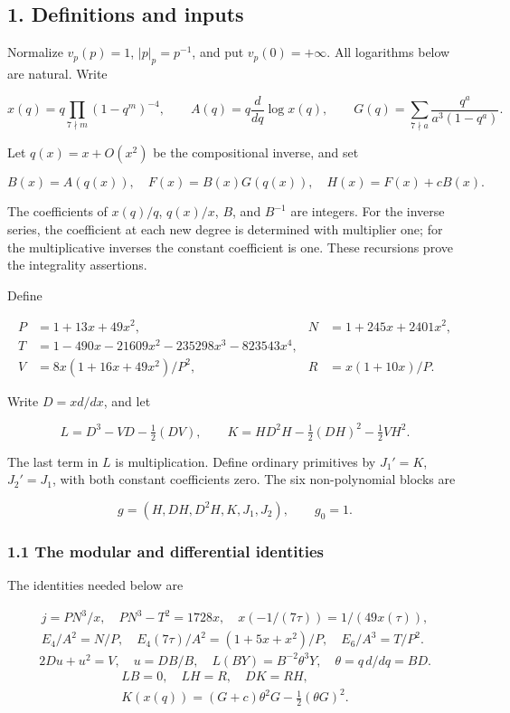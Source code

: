\documentclass[11pt,a4paper]{article}
\begin{document}
\hypertarget{definitions-and-inputs}{%
\subsection{1. Definitions and inputs}\label{definitions-and-inputs}}

Normalize \(v_p(p)=1\), \(|p|_p=p^{-1}\), and put \(v_p(0)=+∞\). All logarithms below are natural. Write

\[
x(q)=q\prod_{7\nmid m}(1-q^m)^{-4},\qquad
A(q)=q\frac{d}{dq}\log x(q),\qquad
G(q)=\sum_{7\nmid a}\frac{q^a}{a^3(1-q^a)}.
\]

Let \(q(x)=x+O(x^{2})\) be the compositional inverse, and set

\[
B(x)=A(q(x)),\quad F(x)=B(x)G(q(x)),\quad H(x)=F(x)+cB(x).
\]

The coefficients of \(x(q)/q\), \(q(x)/x\), \(B\), and \(B^{-1}\) are integers. For the inverse series, the coefficient at each new degree is determined with multiplier one; for the multiplicative inverses the constant coefficient is one. These recursions prove the integrality assertions.

Define

\[
\begin{aligned}
P&=1+13x+49x^2,&N&=1+245x+2401x^2,\\
T&=1-490x-21609x^2-235298x^3-823543x^4,\\
V&=8x(1+16x+49x^2)/P^2,&R&=x(1+10x)/P.
\end{aligned}
\]

Write \(D=x d/dx\), and let

\[
L=D^3-VD-\tfrac12(DV),\qquad
K=HD^2H-\tfrac12(DH)^2-\tfrac12VH^2.
\]

The last term in \(L\) is multiplication. Define ordinary primitives by \(J_{1}'=K\), \(J_{2}'=J_{1}\), with both constant coefficients zero. The six non-polynomial blocks are

\[
g=(H,DH,D^2H,K,J_1,J_2),\qquad g_0=1.
\]

\hypertarget{the-modular-and-differential-identities}{%
\subsubsection{1.1 The modular and differential identities}\label{the-modular-and-differential-identities}}

The identities needed below are

\[
\begin{gathered}
j=PN^3/x,\quad PN^3-T^2=1728x,\quad
x(-1/(7\tau))=1/(49x(\tau)),\\
E_4/A^2=N/P,\quad E_4(7\tau)/A^2=(1+5x+x^2)/P,\quad E_6/A^3=T/P^2.
\end{gathered}\tag{1}
\] \[
2Du+u^2=V,\quad u=DB/B,\quad
L(BY)=B^{-2}\theta^3Y,\quad \theta=q\,d/dq=BD.\tag{2}
\] \[
\begin{gathered}
LB=0,\quad LH=R,\quad DK=RH,\\
K(x(q))=(G+c)\theta^2G-\tfrac12(\theta G)^2.
\end{gathered}\tag{3}
\]
\end{document}
